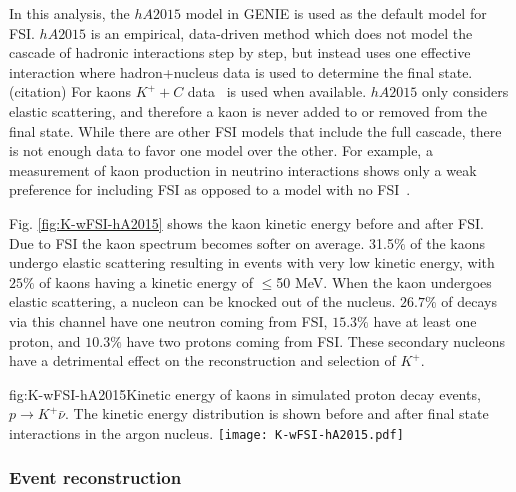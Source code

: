 In this analysis, the $hA2015$ model in GENIE is used as the default model for FSI.  $hA2015$ is an empirical, data-driven method which does not model the cascade of hadronic interactions step by step, but instead uses one effective interaction where hadron+nucleus data is used to determine the final state. (citation)
For kaons $K^{+}+C$ data~\cite{Bugg:1968zz,Friedman:1997eq}
is used when available. $hA2015$ only considers elastic scattering, and therefore a kaon is never added to or removed from the final state. While there are other FSI models that include the full cascade, there is not enough data to favor one model over the other.  For example, a measurement of kaon production in neutrino interactions shows only a weak preference for including FSI as opposed to a model with no FSI~\cite{Marshall:2016rrn}.

Fig. \ref{fig:K-wFSI-hA2015} shows the kaon kinetic energy before and after FSI. Due to FSI the kaon spectrum becomes softer on average. 31.5$\%$ of the kaons undergo elastic scattering resulting in events with very low kinetic energy, with $25\%$ of kaons having a kinetic energy of $\le$50 MeV. When the kaon undergoes elastic scattering, a nucleon can be knocked out of the nucleus. $26.7\%$ of decays via this channel have one neutron coming from FSI, $15.3\%$ have at least one proton, and $10.3\%$ have two protons coming from FSI. These secondary nucleons have a detrimental effect on the reconstruction and selection of $K^{+}$.

\begin{dunefigure}{fig:K-wFSI-hA2015}{Kinetic energy of kaons in simulated proton decay events, $p\rightarrow K^{+} \bar{\nu}$.  The kinetic energy distribution is shown before and after final state interactions in the argon nucleus.}
\texttt{[image: K-wFSI-hA2015.pdf]}
\end{dunefigure}


\subsubsection{Event reconstruction}
\label{sec:event-reconstruction}

